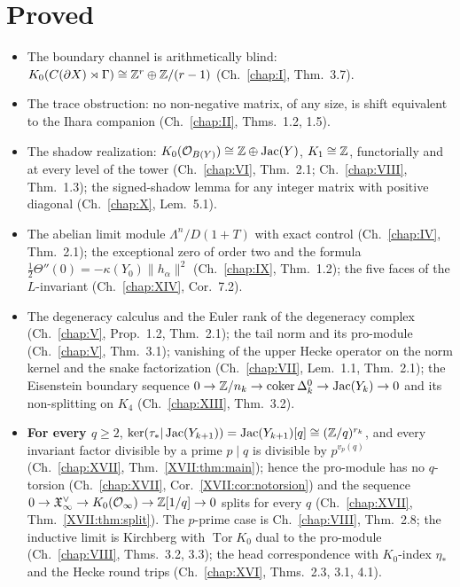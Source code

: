\section{Proved}

\begin{itemize}
\item The boundary channel is arithmetically blind: $K_0(C(\partial X)\rtimes\Gamma)
\cong\mathbb{Z}^r\oplus\mathbb{Z}/(r-1)$ (Ch.~\ref{chap:I}, Thm.~3.7).
\item The trace obstruction: no non-negative matrix, of any size, is shift equivalent to
the Ihara companion (Ch.~\ref{chap:II}, Thms.~1.2, 1.5).
\item The shadow realization: $K_0(\mathcal O_{B(Y)})\cong\mathbb{Z}\oplus\operatorname{Jac}(Y)$, $K_1\cong\mathbb{Z}$,
functorially and at every level of the tower (Ch.~\ref{chap:VI}, Thm.~2.1;
Ch.~\ref{chap:VIII}, Thm.~1.3); the signed-shadow lemma for any integer matrix with
positive diagonal (Ch.~\ref{chap:X}, Lem.~5.1).
\item The abelian limit module $\Lambda^n/D(1+T)$ with exact control
(Ch.~\ref{chap:IV}, Thm.~2.1); the exceptional zero of order two and the formula
$\tfrac12\Theta''(0)=-\kappa(Y_0)\|h_\alpha\|^2$ (Ch.~\ref{chap:IX}, Thm.~1.2); the five
faces of the $L$-invariant (Ch.~\ref{chap:XIV}, Cor.~7.2).
\item The degeneracy calculus and the Euler rank of the degeneracy complex
(Ch.~\ref{chap:V}, Prop.~1.2, Thm.~2.1); the tail norm and its pro-module
(Ch.~\ref{chap:V}, Thm.~3.1); vanishing of the upper Hecke operator on the norm kernel
and the snake factorization (Ch.~\ref{chap:VII}, Lem.~1.1, Thm.~2.1); the Eisenstein
boundary sequence $0\to\mathbb{Z}/n_k\to\operatorname{coker}\Delta_k^0\to\operatorname{Jac}(Y_k)\to0$ and its
non-splitting on $K_4$ (Ch.~\ref{chap:XIII}, Thm.~3.2).
\item \textbf{For every $q\ge2$}, $\ker(\tau_*|\operatorname{Jac}(Y_{k+1}))=\operatorname{Jac}(Y_{k+1})[q]\cong
(\mathbb{Z}/q)^{r_k}$, and every invariant factor divisible by a prime $p\mid q$ is divisible by
$p^{v_p(q)}$ (Ch.~\ref{chap:XVII}, Thm.~\ref{XVII:thm:main}); hence the pro-module has no
$q$-torsion (Ch.~\ref{chap:XVII}, Cor.~\ref{XVII:cor:notorsion}) and the sequence
$0\to\mathfrak X_\infty^\vee\to K_0(\mathcal O_\infty)\to\mathbb{Z}[1/q]\to0$ splits for every $q$
(Ch.~\ref{chap:XVII}, Thm.~\ref{XVII:thm:split}). The $p$-prime case is
Ch.~\ref{chap:VIII}, Thm.~2.8; the inductive limit is Kirchberg with
$\operatorname{Tor}K_0$ dual to the pro-module (Ch.~\ref{chap:VIII}, Thms.~3.2, 3.3); the
head correspondence with $K_0$-index $\eta_*$ and the Hecke round trips
(Ch.~\ref{chap:XVI}, Thms.~2.3, 3.1, 4.1).

\end{itemize}
